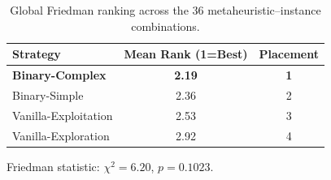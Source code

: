 \begin{table}[htbp]
  \centering
  \caption{Global Friedman ranking across the 36 metaheuristic--instance combinations.}
  \label{tab:friedman_inst15}
  \begin{tabular}{lcc}
    \toprule
    \textbf{Strategy} &
    \textbf{Mean Rank (1=Best)} &
    \textbf{Placement} \\
    \midrule
    \textbf{Binary-Complex}          & \textbf{2.19} & \textbf{1} \\
    Binary-Simple                    &   2.36 &  2 \\
    Vanilla-Exploitation             &   2.53 &  3 \\
    Vanilla-Exploration              &   2.92 &  4 \\
    \bottomrule
  \end{tabular}
  \vspace{1ex}

  \footnotesize Friedman statistic:
  $\chi^2=6.20$, $p=0.1023$.
\end{table}

